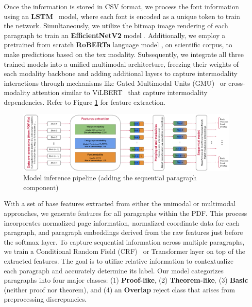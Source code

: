 \documentclass[runningheads]{llncs}
\begin{document}
Once the information is stored in CSV format, we process the font information using an \textbf{LSTM}~\cite{hochreiter1997long} model, where 
each font is encoded as a unique token to train the network. Simultaneously, we utilize the bitmap image 
rendering of each paragraph to train an \textbf{EfficientNetV2} model \cite{efficientnet}. Additionally, we employ a pretrained from scratch \textbf{RoBERTa} language model \cite{mishra:tel-04665528}, 
on scientific corpus, to make predictions based on the tex modality. Subsequently, we 
integrate all three trained models into a unified multimodal architecture, freezing their weights of each modality backbone and adding 
additional layers to capture intermodality interactions through mechanisms like Gated Multimodal Units 
(GMU)~\cite{arevalo2020gated} or cross-modality attention similar to ViLBERT~\cite{DBLP:conf/nips/LuBPL19} that capture intermodality dependencies. Refer to Figure \ref{fig:generalpipeline} for feature extraction.


\begin{figure}[h]
    \centering
    \includegraphics[width=\textwidth]{images/general_pipeline.pdf}
    \caption{Model inference pipeline (adding the sequential paragraph component)}
    \label{fig:generalpipeline}
\end{figure}


With a set of base features extracted from either the unimodal or multimodal approaches, we generate 
features for all paragraphs within the PDF. This process incorporates normalized page information, 
normalized coordinate data for each paragraph, and paragraph embeddings derived from the raw features 
just before the softmax layer. To capture sequential information across multiple paragraphs, we train a 
Conditional Random Field (CRF)~\cite{crf} or Transformer layer on top of the extracted features. The goal is to utilize 
relative information to contextualize each paragraph and accurately determine its label. Our model 
categorizes paragraphs into four major classes: (1) \textbf{Proof-like}, (2) \textbf{Theorem-like}, (3) \textbf{Basic} (neither 
proof nor theorem), and (4) an \textbf{Overlap} reject class that arises from preprocessing discrepancies.
\end{document}
